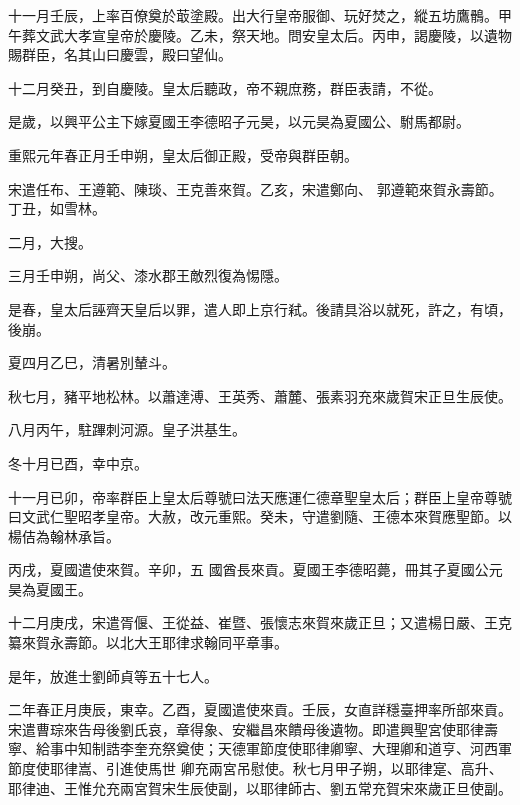 \begin{pinyinscope}
 十一月壬辰，上率百僚奠於菆塗殿。出大行皇帝服御、玩好焚之，縱五坊鷹鶻。甲午葬文武大孝宣皇帝於慶陵。乙未，祭天地。問安皇太后。丙申，謁慶陵，以遺物賜群臣，名其山曰慶雲，殿曰望仙。



 十二月癸丑，到自慶陵。皇太后聽政，帝不親庶務，群臣表請，不從。



 是歲，以興平公主下嫁夏國王李德昭子元昊，以元昊為夏國公、駙馬都尉。



 重熙元年春正月壬申朔，皇太后御正殿，受帝與群臣朝。



 宋遣任布、王遵範、陳琰、王克善來賀。乙亥，宋遣鄭向、
 郭遵範來賀永壽節。丁丑，如雪林。



 二月，大搜。



 三月壬申朔，尚父、漆水郡王敵烈復為惕隱。



 是春，皇太后誣齊天皇后以罪，遣人即上京行弒。後請具浴以就死，許之，有頃，後崩。



 夏四月乙巳，清暑別輦斗。



 秋七月，豬平地松林。以蕭達溥、王英秀、蕭麓、張素羽充來歲賀宋正旦生辰使。



 八月丙午，駐蹕刺河源。皇子洪基生。



 冬十月已酉，幸中京。



 十一月已卯，帝率群臣上皇太后尊號曰法天應運仁德章聖皇太后；群臣上皇帝尊號曰文武仁聖昭孝皇帝。大赦，改元重熙。癸未，守遣劉隨、王德本來賀應聖節。以楊佶為翰林承旨。



 丙戌，夏國遣使來賀。辛卯，五
 國酋長來貢。夏國王李德昭薨，冊其子夏國公元昊為夏國王。



 十二月庚戌，宋遣胥偃、王從益、崔暨、張懷志來賀來歲正旦；又遣楊日嚴、王克纂來賀永壽節。以北大王耶律求翰同平章事。



 是年，放進士劉師貞等五十七人。



 二年春正月庚辰，東幸。乙酉，夏國遣使來貢。壬辰，女直詳穩臺押率所部來貢。宋遣曹琮來告母後劉氏哀，章得象、安繼昌來饋母後遺物。即遣興聖宮使耶律壽寧、給事中知制誥李奎充祭奠使；天德軍節度使耶律卿寧、大理卿和道亨、河西軍節度使耶律嵩、引進使馬世
 卿充兩宮吊慰使。秋七月甲子朔，以耶律寔、高升、耶律迪、王惟允充兩宮賀宋生辰使副，以耶律師古、劉五常充賀宋來歲正旦使副。




\end{pinyinscope}
